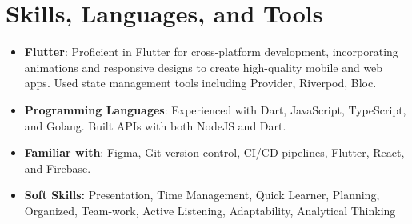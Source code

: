 \documentclass[11pt,a4paper,sans]{moderncv}
\begin{document}
\clearpage

\section{Skills, Languages, and Tools}
 {\begin{itemize}[label=\textbullet]
      \item {\textbf{Flutter}}: Proficient in Flutter for cross-platform development, incorporating animations and responsive designs to create high-quality mobile and web apps. Used state management tools including Provider, Riverpod, Bloc.
      \item {\textbf{Programming Languages}}: Experienced with Dart, JavaScript, TypeScript, and Golang. Built APIs with both NodeJS and Dart.
      \item {\textbf{Familiar with}}: Figma, Git version control, CI/CD pipelines, Flutter, React, and Firebase.
      \item {\textbf{Soft Skills:} Presentation, Time Management, Quick Learner, Planning, Organized, Team-work, Active Listening, Adaptability, Analytical Thinking}
  \end{itemize}}
\end{document}
